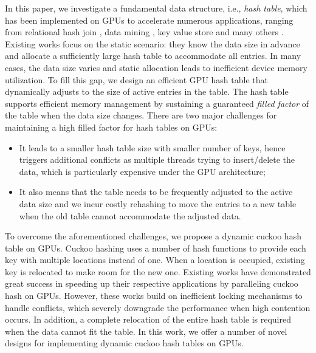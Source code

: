 In this paper, we investigate a fundamental data structure, i.e., \emph{hash table}, which has been implemented on GPUs to accelerate numerous applications, ranging from relational hash join \cite{he2008relational,he2009relational,heimel2013hardware}, data mining \cite{pan2011fast,zhou2010parallel,zhong2014medusa},  key value store \cite{zhang2015mega,hetherington2015memcachedgpu,breslow2016horton} and many others \cite{bowers2010parallel,niessner2013real,pan2010efficient,wu2015gpu}. Existing works \cite{alcantara2009real,zhang2015mega,hong2010mapcg,hetherington2015memcachedgpu,breslow2016horton} focus on the static scenario: they know the data size in advance and allocate a sufficiently large hash table to accommodate all entries. In many cases, the data size varies and static allocation leads to inefficient device memory utilization. To fill this gap, we design an efficient GPU hash table that dynamically adjusts to the size of active entries in the table. The hash table supports efficient memory management by sustaining a guaranteed \emph{filled factor} of the table when the data size changes. There are two major challenges for maintaining a high filled factor for hash tables on GPUs:
\begin{itemize}
	\item It leads to a smaller hash table size with smaller number of keys, hence triggers additional conflicts as multiple threads trying to insert/delete the data, which is particularly expensive under the GPU architecture;
	\item It also means that the table needs to be frequently adjusted to the active data size and we incur costly rehashing to move the entries to a new table when the old table cannot accommodate the adjusted data. 
\end{itemize}

To overcome the aforementioned challenges, we propose a dynamic cuckoo hash table on GPUs. Cuckoo hashing \cite{pagh2004cuckoo} uses a number of hash functions to provide each key with multiple locations instead of one. When a location is occupied, existing key is relocated to make room for the new one. Existing works \cite{alcantara2009real,zhang2015mega,breslow2016horton} have demonstrated great success in speeding up their respective applications by paralleling cuckoo hash on GPUs. However, these works build on inefficient locking mechanisms to handle conflicts, which severely downgrade the performance when high contention occurs. In addition, a complete relocation of the entire hash table is required when the data cannot fit the table. In this work, we offer a number of novel designs for implementing dynamic cuckoo hash tables on GPUs. 

